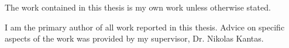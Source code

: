 
\begin{declaration} 
  The work contained in this thesis is my own work unless otherwise stated.

  I am the primary author of all work reported in this thesis. Advice
  on specific aspects of the work was provided by my supervisor,
  Dr. Nikolas Kantas.

\end{declaration}



